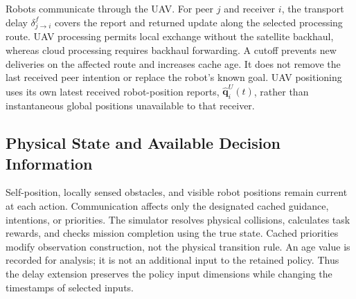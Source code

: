 \begin{panamaaddition}
Robots communicate through the UAV. For peer $j$ and receiver $i$, the
transport delay $\delta_{j\rightarrow i}^{f}$ covers the report and returned
update along the selected processing route. UAV processing permits local
exchange without the satellite backhaul, whereas cloud processing requires
backhaul forwarding. A cutoff prevents new deliveries on the affected route
and increases cache age. It does not remove the last received peer intention
or replace the robot's known goal. UAV positioning uses its own latest
received robot-position reports, $\widehat{\mathbf{q}}_i^U(t)$, rather than
instantaneous global positions unavailable to that receiver.

\subsection{Physical State and Available Decision Information}
Self-position, locally sensed obstacles, and visible robot positions remain
current at each action. Communication affects only the designated cached
guidance, intentions, or priorities. The simulator resolves physical
collisions, calculates task rewards, and checks mission completion using the
true state. Cached priorities modify observation construction, not the
physical transition rule. An age value is recorded for analysis; it is not
an additional input to the retained policy. Thus the delay extension preserves
the policy input dimensions while changing the timestamps of selected inputs.
\end{panamaaddition}
